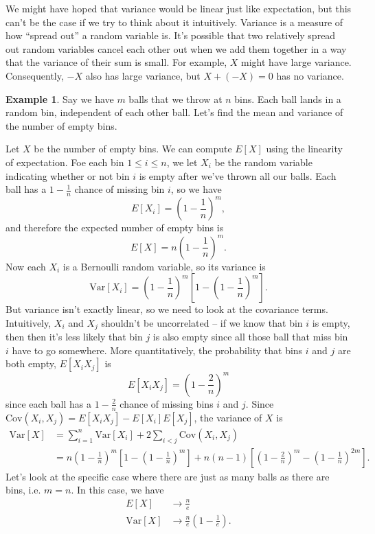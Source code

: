 \documentclass[12pt]{article}
\theoremstyle{plain}
\theoremstyle{definition}
\newtheorem{example}[theorem]{Example}
\theoremstyle{remark}
\newcommand{\Var}{\ensuremath{\textrm{Var}}}
\newcommand{\Cov}{\ensuremath{\textrm{Cov}}}
\begin{document}
We might have hoped that variance would be linear just like expectation, but this can't be the case if we try to think about it intuitively.
Variance is a measure of how ``spread out'' a random variable is.
It's possible that two relatively spread out random variables cancel each other out when we add them together in a way that the variance of their sum is small.
For example, $X$ might have large variance.
Consequently, $-X$ also has large variance, but $X+(-X) = 0$ has no variance.

\begin{example}
    Say we have $m$ balls that we throw at $n$ bins.
    Each ball lands in a random bin, independent of each other ball.
    Let's find the mean and variance of the number of empty bins.

    Let $X$ be the number of empty bins.
    We can compute $E[X]$ using the linearity of expectation.
    Foe each bin $1\leq i \leq n$, we let $X_i$ be the random variable indicating whether or not bin $i$ is empty after we've thrown all our balls.
    Each ball has a $1 - \frac{1}{n}$ chance of missing bin $i$, so we have
    \[
        E[X_i] = \left(1- \frac{1}{n}\right)^m,
    \]
    and therefore the expected number of empty bins is
    \[
        E[X] = n\left(1- \frac{1}{n}\right)^m.
    \]
    Now each $X_i$ is a Bernoulli random variable, so its variance is
    \[
        \Var[X_i] = \left(1- \frac{1}{n}\right)^m\left[1 - \left(1- \frac{1}{n}\right)^m\right].
    \]
    But variance isn't exactly linear, so we need to look at the covariance terms.
    Intuitively, $X_i$ and $X_j$ shouldn't be uncorrelated -- if we know that bin $i$ is empty, then then it's less likely that bin $j$ is also empty since all those ball that miss bin $i$ have to go somewhere.
    More quantitatively, the probability that bins $i$ and $j$ are both empty, $E[X_iX_j]$ is
    \[
        E[X_iX_j] = \left(1 - \frac{2}{n}\right)^m
    \]
    since each ball has a $1-\frac{2}{n}$ chance of missing bins $i$ and $j$.
    Since $\Cov(X_i,X_j) = E[X_iX_j]-E[X_i]E[X_j]$, the variance of $X$ is
    \begin{align*}
        \Var[X] &= \sum_{i=1}^n\Var[X_i] + 2\sum_{i<j}\Cov(X_i, X_j)\\
        &= n\left(1-\frac{1}{n}\right)^m\left[1-\left(1-\frac{1}{n}\right)^m\right] + n(n-1)\left[\left(1-\frac{2}{n}\right)^m - \left(1-\frac{1}{n}\right)^{2m}\right].
    \end{align*}
    Let's look at the specific case where there are just as many balls as there are bins, i.e. $m=n$.
    In this case, we have
    \begin{align*}
        E[X] &\to \frac{n}{e}\\
        \Var[X] &\to \frac{n}{e}\left(1-\frac{1}{e}\right).
    \end{align*}
\end{example}
\end{document}

